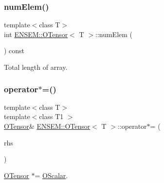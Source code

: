 \subsubsection{\texorpdfstring{numElem()}{numElem()}\hspace{0.1cm}{\footnotesize\ttfamily [3/3]}}
{\footnotesize\ttfamily template$<$class T$>$ \\
int \mbox{\hyperlink{classENSEM_1_1OTensor}{E\+N\+S\+E\+M\+::\+O\+Tensor}}$<$ T $>$\+::num\+Elem (\begin{DoxyParamCaption}{ }\end{DoxyParamCaption}) const\hspace{0.3cm}{\ttfamily [inline]}}



Total length of array. 

\mbox{\label{classENSEM_1_1OTensor_a0326883980545068700bbdd762df5904}} 
\subsubsection{\texorpdfstring{operator$\ast$=()}{operator*=()}\hspace{0.1cm}{\footnotesize\ttfamily [1/6]}}
{\footnotesize\ttfamily template$<$class T$>$ \\
template$<$class T1 $>$ \\
\mbox{\hyperlink{classENSEM_1_1OTensor}{O\+Tensor}}\& \mbox{\hyperlink{classENSEM_1_1OTensor}{E\+N\+S\+E\+M\+::\+O\+Tensor}}$<$ T $>$\+::operator$\ast$= (\begin{DoxyParamCaption}\item[{const \mbox{\hyperlink{classENSEM_1_1OScalar}{O\+Scalar}}$<$ T1 $>$ \&}]{rhs }\end{DoxyParamCaption})\hspace{0.3cm}{\ttfamily [inline]}}



\mbox{\hyperlink{classENSEM_1_1OTensor}{O\+Tensor}} $\ast$= \mbox{\hyperlink{classENSEM_1_1OScalar}{O\+Scalar}}. 

